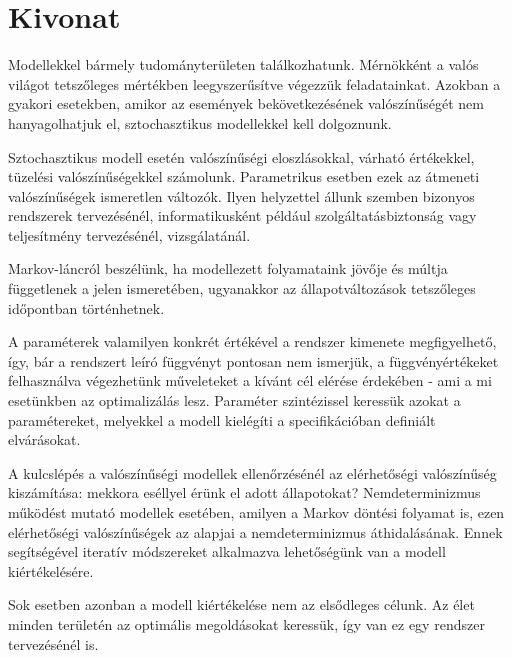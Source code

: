 \setcounter{page}{1}

\selecthungarian

\chapter*{Kivonat}

Modellekkel bármely tudományterületen találkozhatunk.  Mérnökként a valós világot tetszőleges mértékben leegyszerűsítve végezzük feladatainkat. Azokban a gyakori esetekben, amikor az események bekövetkezésének valószínűségét nem hanyagolhatjuk el, sztochasztikus modellekkel kell dolgoznunk.

Sztochasztikus modell esetén valószínűségi eloszlásokkal, várható értékekkel, tüzelési valószínűségekkel számolunk. Parametrikus esetben ezek az átmeneti valószínűségek ismeretlen változók. Ilyen helyzettel állunk szemben bizonyos rendszerek tervezésénél, informatikusként például szolgáltatásbiztonság vagy teljesítmény tervezésénél, vizsgálatánál.

Markov-láncról beszélünk, ha modellezett folyamataink jövője és múltja függetlenek a jelen ismeretében, ugyanakkor az állapotváltozások tetszőleges időpontban történhetnek.

A paraméterek valamilyen konkrét értékével a rendszer kimenete megfigyelhető, így, bár a rendszert leíró függvényt pontosan nem ismerjük, a függvényértékeket felhasználva végezhetünk műveleteket a kívánt cél elérése érdekében - ami a mi esetünkben az optimalizálás lesz. Paraméter szintézissel keressük azokat a paramétereket, melyekkel a modell kielégíti a specifikációban definiált elvárásokat.

A kulcslépés a valószínűségi modellek ellenőrzésénél az elérhetőségi valószínűség kiszámítása: mekkora eséllyel érünk el adott állapotokat? Nemdeterminizmus működést mutató modellek esetében, amilyen a Markov döntési folyamat is, ezen elérhetőségi valószínűségek az alapjai a nemdeterminizmus áthidalásának. Ennek segítségével iteratív módszereket alkalmazva lehetőségünk van a modell kiértékelésére.

Sok esetben azonban a modell kiértékelése nem az elsődleges célunk. Az élet minden területén az optimális megoldásokat keressük, így van ez egy rendszer tervezésénél is. 

